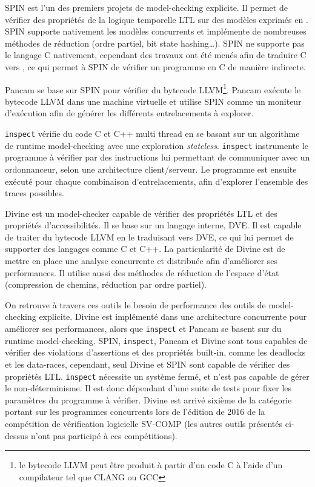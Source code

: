 SPIN\cite{SPIN} est l'un des premiers projets de model-checking
explicite. Il permet de vérifier des propriétés de la logique temporelle
\ac{LTL} sur des modèles exprimés en . SPIN supporte nativement
les modèles concurrents et implémente de nombreuses méthodes de réduction
(ordre partiel, bit state hashing\dots). SPIN ne supporte pas le langage
C nativement, cependant des travaux ont été menés afin de traduire C
vers \cite{jiang_C_to_Promela}, ce qui permet à SPIN de
vérifier un programme en C de manière indirecte.

Pancam\cite{Pancam} se base sur SPIN pour vérifier du bytecode
LLVM\footnote{le bytecode LLVM peut être produit à partir d'un code C à
  l'aide d'un compilateur tel que CLANG ou GCC}. Pancam exécute le
bytecode LLVM dans une machine virtuelle et utilise SPIN comme un
moniteur d'exécution afin de générer les différents entrelacements à
explorer.

\texttt{inspect}\cite{inspect} vérifie du code C et C++
multi thread en se basant sur un algorithme de runtime model-checking
avec une exploration \emph{stateless}. \texttt{inspect} instrumente
le programme à vérifier par des instructions lui permettant de
communiquer avec un ordonnanceur, selon une architecture client/serveur.
Le programme est ensuite exécuté pour chaque combinaison d'entrelacements,
afin d'explorer l'ensemble des traces possibles.

Divine\cite{Divine_3_0} est un model-checker capable de vérifier des
propriétés \ac{LTL} et des propriétés d'accessibilités. Il se base sur un
langage interne, DVE. Il est capable de traiter du bytecode LLVM en le
traduisant vers DVE, ce qui lui permet de supporter des langages comme C
et C++. La particularité de Divine est de mettre en place une analyse
concurrente et distribuée afin d'améliorer ses performances. Il utilise
aussi des méthodes de réduction de l'espace d'état (compression de
chemins, réduction par ordre partiel).

On retrouve à travers ces outils le besoin de performance des outils de
model-checking explicite. Divine est implémenté dans une architecture
concurrente pour améliorer ses performances, alors que \texttt{inspect} et
Pancam se basent sur du runtime model-checking. SPIN, \texttt{inspect}, Pancam
et Divine sont tous capables de vérifier des violations d'assertions et des
propriétés built-in, comme les deadlocks et les data-races, cependant, seul
Divine et SPIN sont capable de vérifier des propriétés \ac{LTL}.
\texttt{inspect} nécessite un système fermé, et n'est pas capable de gérer le
non-déterminisme. Il est donc dépendant d'une suite de tests pour fixer les
paramètres du programme à vérifier. Divine est arrivé sixième de la catégorie
portant sur les programmes concurrents lors de l'édition de 2016 de la
compétition de vérification logicielle SV-COMP\citep{svcomp_2016_result} (les
autres outils présentés ci-dessus n'ont pas participé à ces compétitions).

